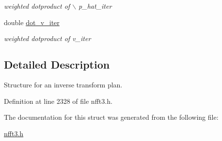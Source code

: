 \begin{CompactItemize}
\begin{CompactList}\small\item\em weighted dotproduct of $\backslash$ p\_\-hat\_\-iter \item\end{CompactList}\item 
\hypertarget{structinfft__plan_o17}{
double \hyperlink{structinfft__plan_o17}{dot\_\-v\_\-iter}}
\label{structinfft__plan_o17}

\begin{CompactList}\small\item\em weighted dotproduct of v\_\-iter \item\end{CompactList}\end{CompactItemize}


\subsection{Detailed Description}
Structure for an inverse transform plan. 



Definition at line 2328 of file nfft3.h.

The documentation for this struct was generated from the following file:\begin{CompactItemize}
\item 
\hyperlink{nfft3_8h}{nfft3.h}\end{CompactItemize}
